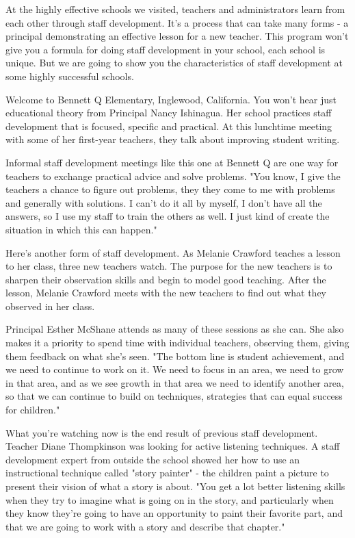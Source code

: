 At the highly effective schools we visited, teachers and administrators learn from each other through staff development.
It's a process that can take many forms - a principal demonstrating an effective lesson for a new teacher.
This program won't give you a formula for doing staff development in your school, each school is unique.
But we are going to show you the characteristics of staff development at some highly successful schools.

Welcome to Bennett Q Elementary, Inglewood, California.
You won't hear just educational theory from Principal Nancy Ishinagua.
Her school practices staff development that is focused, specific and practical.
At this lunchtime meeting with some of her first-year teachers, they talk about improving student writing.

Informal staff development meetings like this one at Bennett Q are one way for teachers to exchange practical advice and solve problems.
"You know, I give the teachers a chance to figure out problems, they they come to me with problems and generally with solutions.
I can't do it all by myself, I don't have all the answers, so I use my staff to train the others as well.
I just kind of create the situation in which this can happen."

Here's another form of staff development.
As Melanie Crawford teaches a lesson to her class, three new teachers watch.
The purpose for the new teachers is to sharpen their observation skills and begin to model good teaching.
After the lesson, Melanie Crawford meets with the new teachers to find out what they observed in her class.

Principal Esther McShane attends as many of these sessions as she can.
She also makes it a priority to spend time with individual teachers, observing them, giving them feedback on what she's seen.
"The bottom line is student achievement, and we need to continue to work on it.
We need to focus in an area, we need to grow in that area, and as we see growth in that area we need to identify another area, so that we can continue to build on techniques, strategies that can equal success for children."

What you're watching now is the end result of previous staff development.
Teacher Diane Thompkinson was looking for active listening techniques.
A staff development expert from outside the school showed her how to use an instructional technique called "story painter" - the children paint a picture to present their vision of what a story is about.
"You get a lot better listening skills when they try to imagine what is going on in the story, and particularly when they know they're going to have an opportunity to paint their favorite part, and that we are going to work with a story and describe that chapter."


